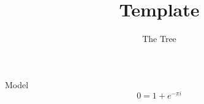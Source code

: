 \documentclass[12pt]{beamer}
\author{The Tree}
\title{Template}
\institute[Stanford University]{Stanford University}
\begin{document}
\begin{frame}[plain]
  \titlepage%
\end{frame}
\addtocounter{framenumber}{-1}

\begin{frame}{Model}
  \[
  0 = 1 + e^{-\pi i}
  \]
\end{frame}
\end{document}
